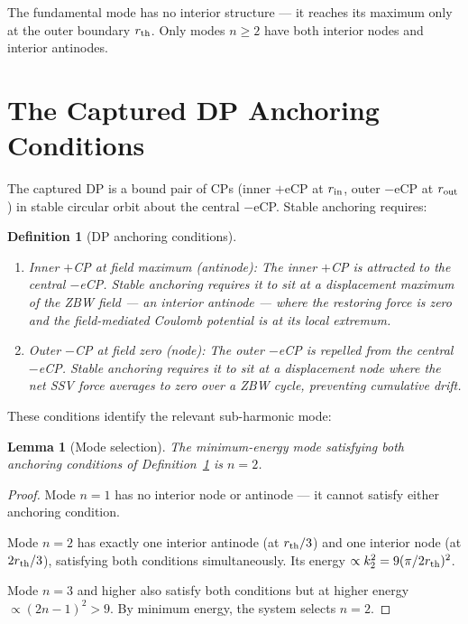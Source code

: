 \documentclass[12pt]{article}
\newtheorem{definition}[theorem]{Definition}
\newtheorem{lemma}[theorem]{Lemma}
\newcommand{\rth}{r_{\rm th}}
\newcommand{\rin}{r_{\rm in}}
\newcommand{\rout}{r_{\rm out}}
\begin{document}
The fundamental mode has no interior structure --- it reaches its
maximum only at the outer boundary $\rth$.  Only modes $n \geq 2$
have both interior nodes and interior antinodes.

\section{The Captured DP Anchoring Conditions}
\label{sec:anchoring}

The captured DP is a bound pair of CPs (inner $+$eCP at $\rin$, outer
$-$eCP at $\rout$) in stable circular orbit about the central $-$eCP.
Stable anchoring requires:

\begin{definition}[DP anchoring conditions]
\label{def:anchor}
\quad
\begin{enumerate}[noitemsep]
  \item \emph{Inner $+$CP at field maximum (antinode):} The inner
    $+$CP is attracted to the central $-$eCP.  Stable anchoring
    requires it to sit at a displacement maximum of the ZBW field
    --- an interior antinode --- where the restoring force is zero
    and the field-mediated Coulomb potential is at its local
    extremum.
  \item \emph{Outer $-$CP at field zero (node):} The outer $-$eCP
    is repelled from the central $-$eCP.  Stable anchoring requires
    it to sit at a displacement node where the net SSV force
    averages to zero over a ZBW cycle, preventing cumulative drift.
\end{enumerate}
\end{definition}

These conditions identify the relevant sub-harmonic mode:

\begin{lemma}[Mode selection]
\label{lem:mode_select}
The minimum-energy mode satisfying both anchoring conditions of
Definition~\ref{def:anchor} is $n = 2$.
\end{lemma}

\begin{proof}
Mode $n=1$ has no interior node or antinode --- it cannot satisfy
either anchoring condition.

Mode $n=2$ has exactly one interior antinode (at $\rth/3$) and
one interior node (at $2\rth/3$), satisfying both conditions
simultaneously.  Its energy $\propto k_2^2 = 9(\pi/2\rth)^2$.

Mode $n=3$ and higher also satisfy both conditions but at higher
energy $\propto (2n-1)^2 > 9$.  By minimum energy, the system
selects $n=2$.
\end{proof}
\end{document}
